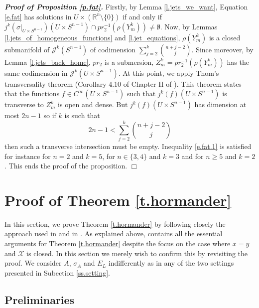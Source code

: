 \documentclass[10pt,twoside]{article}
\newcommand{\man}{\mathcal{X}}
\newcommand{\calJ}{\mathcal{J}}
\newcommand{\Rnzls}{\mathbb{R}^n\setminus\{0\}}
\newenvironment{prf}[1][]
{\vskip 2mm  {\it \bf Proof#1. }}{$\Box$ \vskip 2mm}
\numberwithin{theorem}{section}
\begin{document}
\begin{prf}[ of Proposition \ref{p.fat}]
Firstly, by Lemma \ref{l.jets_we_want}, Equation \eqref{e.fat} has solutions in $U\times(\Rnzls)$ if and only if $j^k\left(\sigma|_{U\times S^{n-1}}\right)(U\times S^{n-1})\cap pr_2^{-1}\left(\rho(Y^k_m)\right)\neq\emptyset$. Now, by Lemmas \ref{l.jets_of_homogeneous_functions} and \ref{l.jet_equations}, $\rho\left(Y^k_m\right)$ is a closed submanifold of $\calJ^k\left(S^{n-1}\right)$ of codimension $\sum_{j=2}^k\binom{n+j-2}{j}$. Since moreover, by Lemma \ref{l.jets_back_home}, $pr_2$ is a submersion, $Z^k_m=pr_2^{-1}\left(\rho(Y^k_m)\right)$ has the same codimension in $\calJ^k\left(U\times S^{n-1}\right)$. At this point, we apply Thom's transversality theorem (Corollary 4.10 of Chapter II of \cite{gg_stable}). This theorem states that the functions $f\in C^\infty\left(U\times S^{n-1}\right)$ such that $j^k(f)(U\times S^{n-1})$ is transverse to $Z^k_m$ is open and dense. But $j^k(f)\left(U\times S^{n-1}\right)$ has dimension at most $2n-1$ so if $k$ is such that
\begin{equation}\label{e.fat.1}
2n-1<\sum_{j=2}^k\binom{n+j-2}{j}
\end{equation}
then such a transverse intersection must be empty. Inequality \eqref{e.fat.1} is satisfied for instance for $n=2$ and $k=5$, for $n\in\{3,4\}$ and $k=3$ and for $n\geq 5$ and $k=2$. This ends the proof of the proposition.
\end{prf}



\appendix

\section{Proof of Theorem \ref{t.hormander}}\label{s.hormander}

In this section, we prove Theorem \ref{t.hormander} by following closely the approach used in \cite{ho68} and in \cite{gawe14}. As explained above, \cite{gawe14} contains all the essential arguments for Theorem \ref{t.hormander} despite the focus on the case where $x=y$ and $\man$ is closed. In this section we merely wish to confirm this by revisiting the proof. We consider $A$, $\sigma_A$ and $E_L$ indifferently as in any of the two settings presented in Subection \ref{ss.setting}.

\subsection{Preliminaries}
\end{document}
